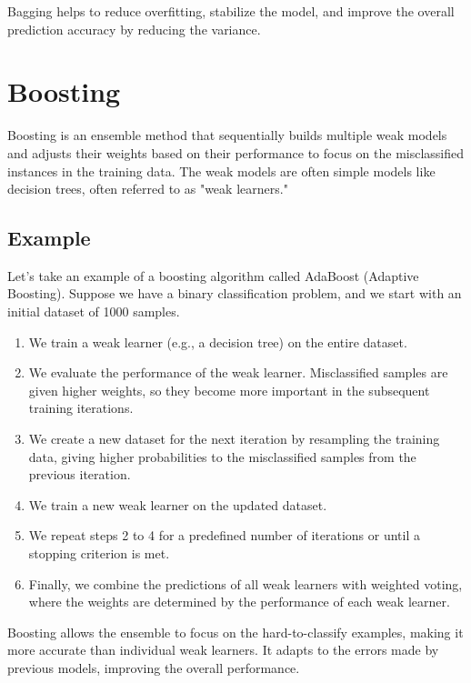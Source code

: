 \documentclass{article}
\begin{document}
Bagging helps to reduce overfitting, stabilize the model, and improve the overall prediction accuracy by reducing the variance.

\section{Boosting}
Boosting is an ensemble method that sequentially builds multiple weak models and adjusts their weights based on their performance to focus on the misclassified instances in the training data. The weak models are often simple models like decision trees, often referred to as "weak learners."

\subsection{Example}
Let's take an example of a boosting algorithm called AdaBoost (Adaptive Boosting). Suppose we have a binary classification problem, and we start with an initial dataset of 1000 samples.

\begin{enumerate}[label=\arabic*.]
  \item We train a weak learner (e.g., a decision tree) on the entire dataset.
  \item We evaluate the performance of the weak learner. Misclassified samples are given higher weights, so they become more important in the subsequent training iterations.
  \item We create a new dataset for the next iteration by resampling the training data, giving higher probabilities to the misclassified samples from the previous iteration.
  \item We train a new weak learner on the updated dataset.
  \item We repeat steps 2 to 4 for a predefined number of iterations or until a stopping criterion is met.
  \item Finally, we combine the predictions of all weak learners with weighted voting, where the weights are determined by the performance of each weak learner.
\end{enumerate}

Boosting allows the ensemble to focus on the hard-to-classify examples, making it more accurate than individual weak learners. It adapts to the errors made by previous models, improving the overall performance.
\end{document}
